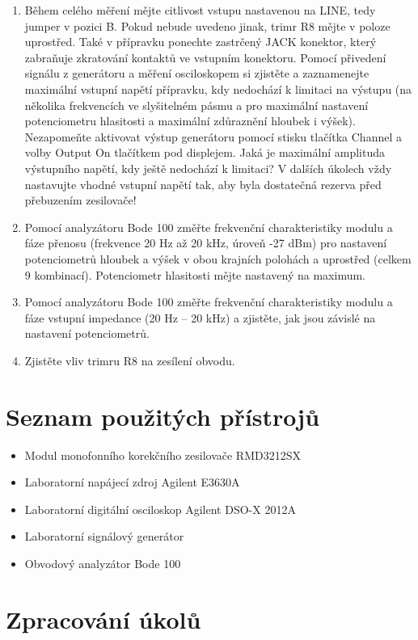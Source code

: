 \documentclass[a4paper, czech]{article}
\begin{document}
\begin{enumerate}
    \item Během celého měření mějte citlivost vstupu nastavenou na LINE, tedy jumper v pozici B. Pokud nebude uvedeno jinak, trimr R8 mějte v poloze uprostřed. Také v přípravku ponechte zastrčený JACK konektor, který zabraňuje zkratování kontaktů ve vstupním konektoru. Pomocí přivedení signálu z generátoru a měření osciloskopem si zjistěte a zaznamenejte maximální vstupní napětí přípravku, kdy nedochází k limitaci na výstupu (na několika frekvencích ve slyšitelném pásmu a pro maximální nastavení potenciometru hlasitosti a maximální zdůraznění hloubek i výšek). Nezapomeňte aktivovat výstup generátoru pomocí stisku tlačítka Channel a volby Output On tlačítkem pod displejem. Jaká je maximální amplituda výstupního napětí, kdy ještě nedochází k limitaci? V dalších úkolech vždy nastavujte vhodné vstupní napětí tak, aby byla dostatečná rezerva před přebuzením zesilovače!
    \item Pomocí analyzátoru Bode 100 změřte frekvenční charakteristiky modulu a fáze přenosu (frekvence 20 Hz až 20 kHz, úroveň -27 dBm) pro nastavení potenciometrů hloubek a výšek v obou krajních polohách a uprostřed (celkem 9 kombinací). Potenciometr hlasitosti mějte nastavený na maximum.
    \item Pomocí analyzátoru Bode 100 změřte frekvenční charakteristiky modulu a fáze vstupní impedance (20 Hz – 20 kHz) a zjistěte, jak jsou závislé na nastavení potenciometrů.
    \item Zjistěte vliv trimru R8 na zesílení obvodu.
\end{enumerate}

\section{Seznam použitých přístrojů}

\begin{itemize}
    \item Modul monofonního korekčního zesilovače RMD3212SX
    \item Laboratorní napájecí zdroj Agilent E3630A
    \item Laboratorní digitální osciloskop Agilent DSO-X 2012A
    \item Laboratorní signálový generátor
    \item Obvodový analyzátor Bode 100
\end{itemize}

\section{Zpracování úkolů}
\end{document}
